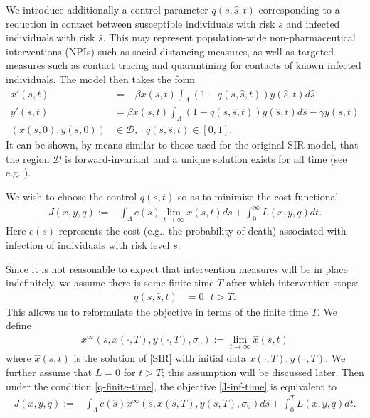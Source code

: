 \documentclass[english,12pt,letter]{article}
\newcommand{\Rnot}{\sigma_0}
\newcommand{\xinf}{x^\infty}
\newcommand{\dom}{{\mathcal D}}
\newcommand{\sdummy}{\hat{s}}
\begin{document}
We introduce additionally a control parameter $q(s,\sdummy, t)$ corresponding to a reduction in contact
between susceptible individuals with risk $s$ and infected individuals with risk $\sdummy$.  This may represent population-wide non-pharmaceutical
interventions (NPIs) such as social distancing measures, as well as targeted measures such as
contact tracing and quarantining for contacts of known infected individuals.  The model then
takes the form
\begin{subequations} \label{SIRqc}
\begin{align} 
    x'(s,t) & = -\beta x(s,t) \int_\Lambda (1-q(s,\sdummy,t))y(\sdummy,t) d\sdummy \label{eq:x} \\
    y'(s,t) & = \beta x(s,t) \int_\Lambda(1-q(s,\sdummy,t))y(\sdummy,t)d\sdummy - \gamma y(s,t) \label{eq:y} \\
    (x(s,0),y(s,0)) & \in \dom,  \ \ \ q(s,\sdummy,t) \in [0,1].
\end{align}
\end{subequations}
It can be shown, by means similar to those used for the original SIR model, that
the region $\dom$ is forward-invariant and a unique solution exists for all
time (see e.g. \cite{hethcote2000mathematics}).

We wish to choose the control $q(s,t)$ so as to minimize the cost functional
\begin{align} \label{J-inf-time}
    J(x,y,q) := -\int_\Lambda c(s) \lim_{t\to\infty}x(s,t) ds + \int_0^\infty L(x,y,q) dt.
\end{align}
Here $c(s)$ represents the cost (e.g., the probability of death) associated
with infection of individuals with risk level $s$.

Since it is not reasonable to expect that intervention measures will be in place
indefinitely, we assume there is some finite time $T$ after which intervention stops:
\begin{align} \label{q-finite-time}
    q(s,\sdummy,t) & = 0 \ \ \ t>T.
\end{align}
This allows us to reformulate the objective in terms of the finite time $T$.  We define
\begin{align}
    \xinf(s,x(\cdot,T),y(\cdot,T),\Rnot) := \lim_{t\to\infty} \hat{x}(s,t)
\end{align}
where $\hat{x}(s,t)$ is the solution of \eqref{SIR} with initial data $x(\cdot,T), y(\cdot,T)$.
We further assume that $L=0$ for $t>T$; this assumption will be discussed later.
Then under the condition \eqref{q-finite-time}, the objective \eqref{J-inf-time} is
equivalent to
\begin{align} \label{J-infdim}
    J(x,y,q) := -\int_\Lambda c(\sdummy) \xinf(\sdummy,x(s,T),y(s,T),\Rnot) d\sdummy + \int_0^T L(x,y,q) dt.
\end{align}
\end{document}
